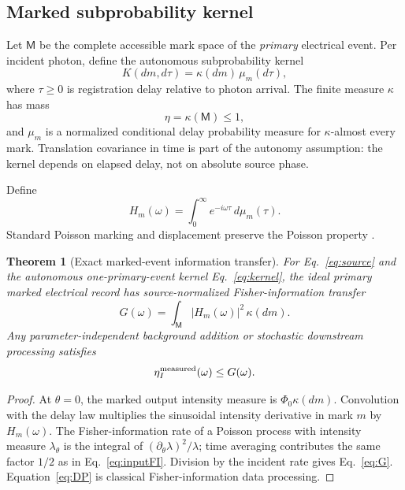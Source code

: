 \documentclass[aps,prapplied,preprint,nofootinbib]{revtex4-2}
\newtheorem{theorem}{Theorem}
\newcommand{\M}{\mathsf M}
\begin{document}
\subsection{Marked subprobability kernel}

Let $\M$ be the complete accessible mark space of the \emph{primary} electrical event. Per incident photon, define the autonomous subprobability kernel
\begin{equation}
K(dm,d\tau)=\kappa(dm)\,\mu_m(d\tau),
\label{eq:kernel}
\end{equation}
where $\tau\ge0$ is registration delay relative to photon arrival. The finite measure $\kappa$ has mass
\begin{equation}
\eta=\kappa(\M)\le1,
\end{equation}
and $\mu_m$ is a normalized conditional delay probability measure for $\kappa$-almost every mark. Translation covariance in time is part of the autonomy assumption: the kernel depends on elapsed delay, not on absolute source phase.

Define
\begin{equation}
H_m(\omega)=\int_0^\infty e^{-i\omega\tau}\,d\mu_m(\tau).
\end{equation}
Standard Poisson marking and displacement preserve the Poisson property \cite{Kingman1993,DaleyVereJones2003}.

\begin{theorem}[Exact marked-event information transfer]
For Eq.~\eqref{eq:source} and the autonomous one-primary-event kernel Eq.~\eqref{eq:kernel}, the ideal primary marked electrical record has source-normalized Fisher-information transfer
\begin{equation}
\boxed{
G(\omega)=\int_{\M}|H_m(\omega)|^2\,\kappa(dm).}
\label{eq:G}
\end{equation}
Any parameter-independent background addition or stochastic downstream processing satisfies
\begin{equation}
\eta_I^{\rm measured}(\omega)\le G(\omega).
\label{eq:DP}
\end{equation}
\end{theorem}

\begin{proof}
At $\theta=0$, the marked output intensity measure is $\Phi_0\kappa(dm)$. Convolution with the delay law multiplies the sinusoidal intensity derivative in mark $m$ by $H_m(\omega)$. The Fisher-information rate of a Poisson process with intensity measure $\lambda_\theta$ is the integral of $(\partial_\theta\lambda)^2/\lambda$; time averaging contributes the same factor $1/2$ as in Eq.~\eqref{eq:inputFI}. Division by the incident rate gives Eq.~\eqref{eq:G}. Equation~\eqref{eq:DP} is classical Fisher-information data processing.
\end{proof}
\end{document}
